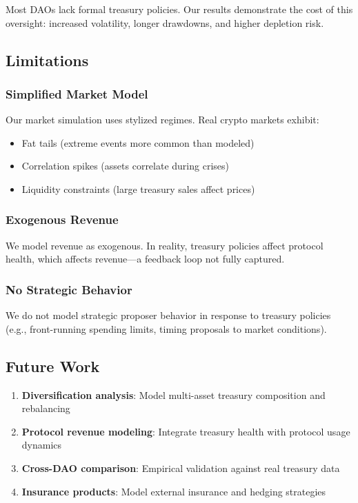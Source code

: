 Most DAOs lack formal treasury policies. Our results demonstrate the cost of this oversight: increased volatility, longer drawdowns, and higher depletion risk.

\subsection{Limitations}

\subsubsection{Simplified Market Model}

Our market simulation uses stylized regimes. Real crypto markets exhibit:
\begin{itemize}
    \item Fat tails (extreme events more common than modeled)
    \item Correlation spikes (assets correlate during crises)
    \item Liquidity constraints (large treasury sales affect prices)
\end{itemize}

\subsubsection{Exogenous Revenue}

We model revenue as exogenous. In reality, treasury policies affect protocol health, which affects revenue---a feedback loop not fully captured.

\subsubsection{No Strategic Behavior}

We do not model strategic proposer behavior in response to treasury policies (e.g., front-running spending limits, timing proposals to market conditions).

\subsection{Future Work}

\begin{enumerate}
    \item \textbf{Diversification analysis}: Model multi-asset treasury composition and rebalancing
    \item \textbf{Protocol revenue modeling}: Integrate treasury health with protocol usage dynamics
    \item \textbf{Cross-DAO comparison}: Empirical validation against real treasury data
    \item \textbf{Insurance products}: Model external insurance and hedging strategies
\end{enumerate}
